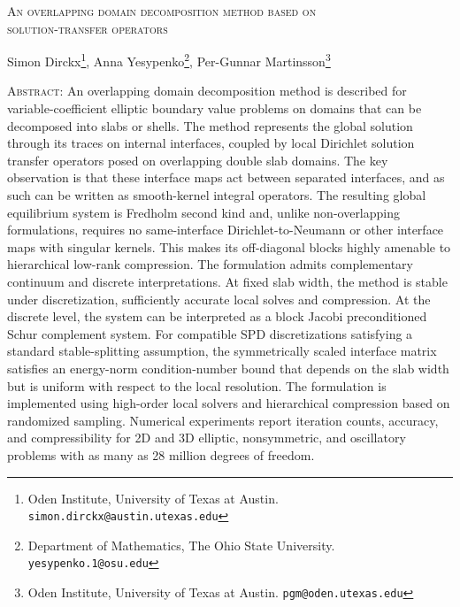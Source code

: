 \documentclass[final,onefignum,onetabnum]{siamart250211}
\theoremstyle{definition}
\begin{document}
\begin{center}
\textsc{An overlapping domain decomposition method based on\\ solution-transfer operators}

\vspace{3mm}
\renewcommand*{\thefootnote}{\fnsymbol{footnote}}
Simon Dirckx\footnote{Oden Institute, University of Texas at Austin. \Letter\;\texttt{simon.dirckx@austin.utexas.edu}}, Anna Yesypenko\footnote{Department of Mathematics, The Ohio State University. \Letter\;\texttt{yesypenko.1@osu.edu}}, Per-Gunnar Martinsson\footnote{Oden Institute, University of Texas at Austin. \Letter\;\texttt{pgm@oden.utexas.edu}}
\vspace{10mm}


\begin{minipage}{120mm}
\textsc{Abstract:}
An overlapping domain decomposition method is described for variable-coefficient elliptic boundary value problems on domains that can be decomposed into slabs or shells. The method represents the global solution through its traces on internal interfaces, coupled by local Dirichlet solution transfer operators posed on overlapping double slab domains. The key observation is that these interface maps act between separated interfaces, and as such can be written as smooth-kernel integral operators. The resulting global equilibrium system is Fredholm second kind and, unlike non-overlapping formulations, requires no same-interface Dirichlet-to-Neumann or other interface maps with singular kernels. This makes its off-diagonal blocks highly amenable to hierarchical low-rank compression. The formulation admits complementary continuum and discrete interpretations. At fixed slab width, the method is stable under discretization, sufficiently accurate local solves and compression. At the discrete level, the system can be interpreted as a block Jacobi preconditioned Schur complement system. 
For compatible SPD discretizations satisfying a standard stable-splitting assumption, the symmetrically scaled interface matrix satisfies an energy-norm condition-number bound that depends on the slab width but is uniform with respect to the local resolution.
The formulation is implemented using high-order local solvers and hierarchical compression based on randomized sampling. 
Numerical experiments report iteration counts, accuracy, and compressibility for 2D and 3D elliptic, nonsymmetric, and oscillatory problems with as many as 28 million degrees of freedom.
\end{minipage}
\end{center}
\renewcommand*{\thefootnote}{\arabic{footnote}}
\setcounter{footnote}{0}
\end{document}
